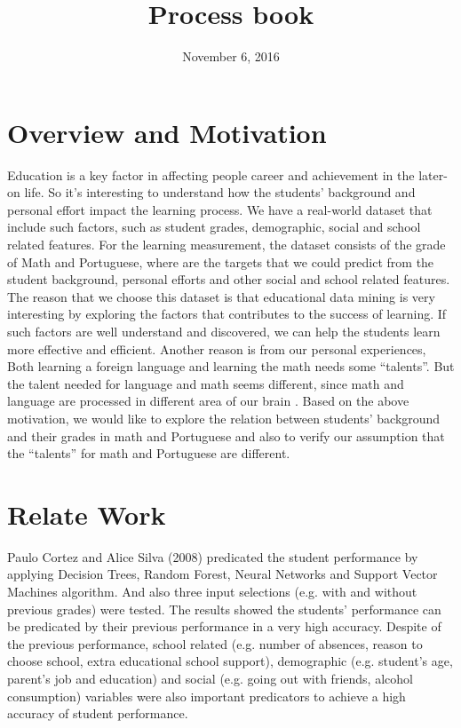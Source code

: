 \documentclass{article}
\begin{document}
\title{Process book} 
\date{November 6, 2016}
\maketitle

\section{Overview and Motivation}
Education is a key factor in affecting people career and achievement in the later-on life. So it's interesting to understand how the students' background and personal effort impact the learning process. We have a real-world dataset that include such factors, such as student grades, demographic, social and school related features. For the learning measurement, the dataset consists of the grade of Math and Portuguese, where are the targets that we could predict from the student background, personal efforts and other social and school related features. The reason that we choose this dataset is that educational data mining is very interesting by exploring the factors that contributes to the success of learning. If such factors are well understand and discovered, we can help the students learn more effective and efficient. Another reason is from our personal experiences, Both learning a foreign language and learning the math needs some ``talents''. But the talent needed for language and math seems different, since math and language are processed in different area of our brain . Based on the above motivation, we would like to explore the relation between students' background and their grades in math and Portuguese and also to verify our assumption that the ``talents'' for math and Portuguese are different.

\section{Relate Work}
Paulo Cortez and Alice Silva (2008) predicated the student performance by applying Decision Trees, Random Forest, Neural Networks and Support Vector Machines algorithm. And also three input selections (e.g. with and without previous grades) were tested. The results showed the students' performance can be predicated by their previous performance in a very high accuracy. Despite of the previous performance, school related
(e.g. number of absences, reason to choose school, extra educational school support), demographic (e.g. student's age, parent's job and education) and social (e.g. going out with friends, alcohol consumption) variables were also important predicators to achieve a high accuracy of student performance.
\end{document}
